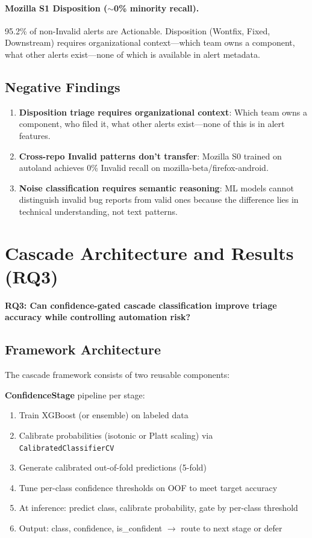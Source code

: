 \documentclass[11pt]{article}
\begin{document}
\paragraph{Mozilla S1 Disposition ($\sim$0\% minority recall).}
95.2\% of non-Invalid alerts are Actionable. Disposition (Wontfix, Fixed, Downstream) requires organizational context---which team owns a component, what other alerts exist---none of which is available in alert metadata.

\subsection{Negative Findings}

\begin{enumerate}
    \item \textbf{Disposition triage requires organizational context}: Which team owns a component, who filed it, what other alerts exist---none of this is in alert features.
    \item \textbf{Cross-repo Invalid patterns don't transfer}: Mozilla S0 trained on autoland achieves 0\% Invalid recall on mozilla-beta/firefox-android.
    \item \textbf{Noise classification requires semantic reasoning}: ML models cannot distinguish invalid bug reports from valid ones because the difference lies in technical understanding, not text patterns.
\end{enumerate}

\section{Cascade Architecture and Results (RQ3)}
\label{sec:rq3}

\textbf{RQ3: Can confidence-gated cascade classification improve triage accuracy while controlling automation risk?}

\subsection{Framework Architecture}

The cascade framework consists of two reusable components:

\textbf{ConfidenceStage} pipeline per stage:
\begin{enumerate}
    \item Train XGBoost (or ensemble) on labeled data
    \item Calibrate probabilities (isotonic or Platt scaling) via \texttt{CalibratedClassifierCV}
    \item Generate calibrated out-of-fold predictions (5-fold)
    \item Tune per-class confidence thresholds on OOF to meet target accuracy
    \item At inference: predict class, calibrate probability, gate by per-class threshold
    \item Output: class, confidence, is\_confident $\rightarrow$ route to next stage or defer
\end{enumerate}
\end{document}
